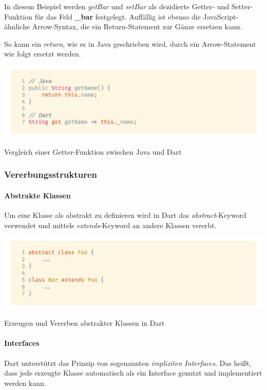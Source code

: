 In diesem Beispiel werden \textit{getBar} und \textit{setBar} als dezidierte Getter- und Setter-Funktion für das Feld \textbf{\_bar} festgelegt. Auffällig ist ebenso die JavaScript-ähnliche Arrow-Syntax, die ein Return-Statement zur Gänze ersetzen kann.

So kann ein \textit{return}, wie es in Java geschrieben wird, durch ein Arrow-Statement wie folgt
ersetzt werden.

\begin{code}[h]
    \centering
    \includegraphics[width=1\textwidth]{images/Dart/theory/dartVSJavaGetter.png}
    \vspace{-25pt}
    \caption{Vergleich einer Getter-Funktion zwischen Java und Dart}
\end{code}

\newpage

\subsubsection{Vererbungsstrukturen}

\paragraph{Abstrakte Klassen}


Um eine Klasse als abstrakt zu definieren wird in Dart das \textit{abstract}-Keyword verwendet und mittels
\textit{extends}-Keyword an andere Klassen vererbt.

\begin{code}[h]
    \centering
    \includegraphics[width=1\textwidth]{images/Dart/theory/dartAbstractClass.png}
    \vspace{-25pt}
    \caption{Erzeugen und Vererben abstrakter Klassen in Dart}
\end{code}

\paragraph{Interfaces}
 

Dart unterstützt das Prinzip von sogenannten \textit{impliziten Interfaces}. Das heißt, dass jede erzeugte Klasse automatisch als ein Interface genutzt und implementiert werden kann.

